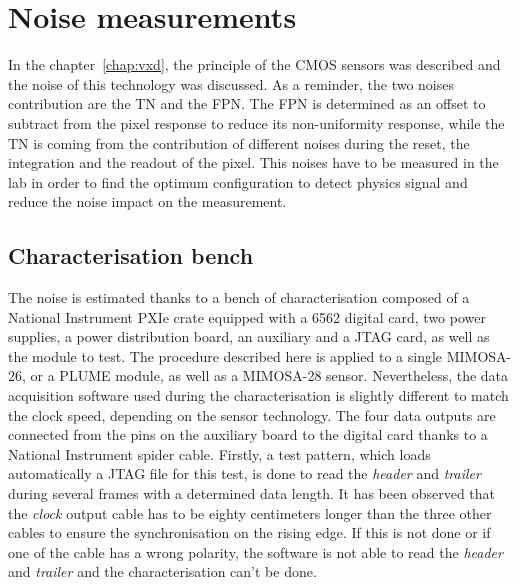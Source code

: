 \section{Noise measurements}

  In the chapter~\ref{chap:vxd}, the principle of the \gls{CMOS} sensors was described and the noise of this technology was discussed.
  As a reminder, the two noises contribution are the \acrfull{TN} and the \acrfull{FPN}.
  The \gls{FPN} is determined as an offset to subtract from the pixel response to reduce its non-uniformity response, while the \gls{TN} is coming from the contribution of different noises during the reset, the integration and the readout of the pixel.
  This noises have to be measured in the lab in order to find the optimum configuration to detect physics signal and reduce the noise impact on the measurement.

  \subsection{Characterisation bench}

  The noise is estimated thanks to a bench of characterisation composed of a National Instrument PXIe crate equipped with a 6562 digital card, two power supplies, a power distribution board, an auxiliary and a JTAG card, as well as the module to test.
  The procedure described here is applied to a single MIMOSA-26, or a PLUME module, as well as a MIMOSA-28 sensor.
  Nevertheless, the data acquisition software used during the characterisation is slightly different to match the clock speed, depending on the sensor technology.
  The four data outputs are connected from the pins on the auxiliary board to the digital card thanks to a National Instrument spider cable.
  Firstly, a test pattern, which loads automatically a JTAG file for this test, is done to read the \textit{header} and \textit{trailer} during several frames with a determined data length.
  It has been observed that the \textit{clock} output cable has to be eighty centimeters longer than the three other cables to ensure the synchronisation on the rising edge.
  If this is not done or if one of the cable has a wrong polarity, the software is not able to read the \textit{header} and \textit{trailer} and the characterisation can't be done.


